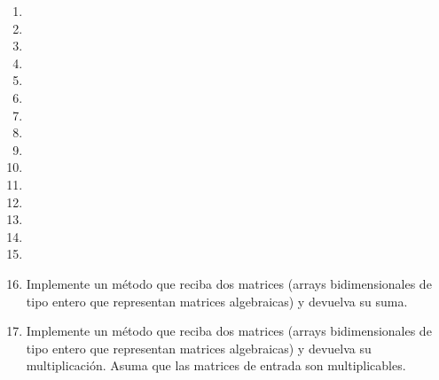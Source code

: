 \begin{enumerate}
    \item
    

    \item 
    

    \item 
    

    \item
    

    \item 
    

    \item 
    

    \item
    

    \item
    

    \item
    

    \item
    

    \item
    

    \item
    

    \item
    
    
    \item 
    

    \item
    
    
    \item
    Implemente un método que reciba dos matrices (arrays bidimensionales de tipo entero que representan matrices algebraicas) y devuelva su suma.

    \item
    Implemente un método que reciba dos matrices (arrays bidimensionales de tipo entero que representan matrices algebraicas) y devuelva su multiplicación. Asuma que las matrices de entrada son multiplicables.


\end{enumerate}
